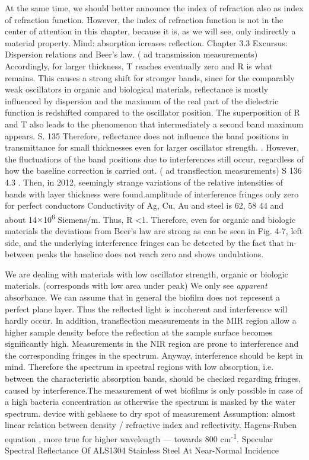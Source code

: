\documentclass[foods,article,submit,moreauthors,pdftex]{Definitions/mdpi}
\begin{document}
\cite{Mayrhoefer_script_2021} At the same time, we should better announce the index of refraction also as index of refraction function. However, the index of refraction function is not in the center of attention in this chapter, because it is, as we will see, only indirectly a material property. Mind: absorption icreases reflection. Chapter 3.3 Excursus: Dispersion relations and Beer’s law.
( ad transmission measurements)  Accordingly, for larger thickness, T reaches eventually zero and R is what remains. This causes a strong shift for stronger bands, since for the comparably weak oscillators in organic and biological materials, reflectance is mostly influenced  by dispersion and the maximum of the real part of the dielectric function is redshifted compared to 
the oscillator position. The superposition of R and T also leads to the phenomenon that 
intermediately a second band maximum appears. S. 135 Therefore, reflectance does not influence the band positions in transmittance for small thicknesses 
even for larger oscillator strength. .
However, the fluctuations of the band positions due to 
interferences still occur, regardless of how the baseline correction is carried out. 
( ad transflection measurements) S 136 4.3  .
Then, in 2012, seemingly strange variations of the  relative intensities of bands with layer thickness were found.amplitude of interference fringes only zero for perfect conductors
Conductivity of  Ag, Cu, Au and steel is 62, 58 44 and about 14$\times$10\textsuperscript{6} Siemens/m. Thus, R <1. 
Therefore, even for organic and biologic materials the deviations from Beer’s law are strong as can be seen in Fig. 4-7, left side, and the underlying interference fringes can be detected by the fact that in-between peaks the baseline does not reach zero and shows undulations.

We are dealing with materials with low oscillator strength,  organic or biologic materials. (corresponds with low area under peak) 
We only see \textit{apparent} absorbance. 
We can assume that in general the biofilm does not represent a perfect plane layer. Thus the reflected light is incoherent and interference will hardly occur. In addition, transflection measurements in the MIR region allow a higher sample density before the reflection at the sample surface becomes significantly high. Measurements in the NIR region are prone to interference and the corresponding fringes in the spectrum. Anyway, interference should be kept in mind. Therefore the spectrum in spectral regions with low absorption, i.e. between the characteristic absorption bands, should be checked regarding fringes, caused by interference.The measurement of wet biofilms is only possible in case of a high bacteria concentration as otherwise the spectrum is masked by the water spectrum. device with geblaese to dry spot of measurement Assumption: almost linear relation between density / refractive index and reflectivity. Hagens-Ruben equation , more true for higher wavelength --- towards 800 cm\textsuperscript{-1}.
Specular Spectral Reflectance Of ALS1304 Stainless Steel At Near-Normal Incidence
\end{document}
